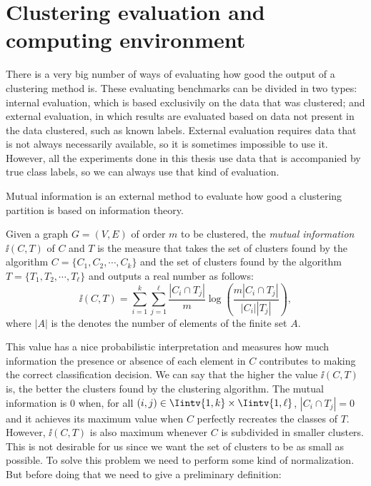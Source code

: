 \section{Clustering evaluation and computing environment}
There is a very big number of ways of evaluating how good the output of a clustering method is.
These evaluating benchmarks can be divided in two types: internal evaluation, which is based exclusivily on the data that was clustered; and external evaluation, in which results are evaluated based on data not present in the data clustered, such as known labels.
External evaluation requires data that is not always necessarily available, so it is sometimes impossible to use it.
However, all the experiments done in this thesis use data that is accompanied by true class labels, so we can always use that kind of evaluation.

Mutual information is an external method to evaluate how good a clustering partition is based on information theory.

\begin{definition}
   Given a graph $G = (V,E)$ of order $m$ to be clustered, the \textit{mutual information} $\ii (C, T)$ of $C$ and $T$ is the measure that takes the set of clusters found by the algorithm $C = \{ C_1, C_2, \cdots, C_k \}$ and the set of clusters found by the algorithm $T = \{ T_1, T_2, \cdots, T_\ell \}$ and outputs a real number as follows:
\begin{equation}
   \ii (C, T) = \sum_{i=1}^k \sum _{j=1}^\ell \frac{|C_i \cap T_j|}{m} \log \left( \frac{m |C_i \cap T_j|}{|C_i| |T_j|} \right),
\end{equation}
where $|A|$ is the denotes the number of elements of the finite set $A$.
\end{definition}

This value has a nice probabilistic interpretation and measures how much information the presence or absence of each element in $C$ contributes to making the correct classification decision. 
We can say that the higher the value $\ii (C, T)$ is, the better the clusters found by the clustering algorithm.
The mutual information is $0$ when, for all $(i,j) \in \Iintv{1,k} \times \Iintv{1,\ell}$, $|C_i \cap T_j| = 0$ and it achieves its maximum value when $C$ perfectly recreates the classes of $T$.
However, $\ii (C,T)$ is also maximum whenever $C$ is subdivided in smaller clusters.
This is not desirable for us since we want the set of clusters to be as small as possible.
To solve this problem we need to perform some kind of normalization.
But before doing that we need to give a preliminary definition:


